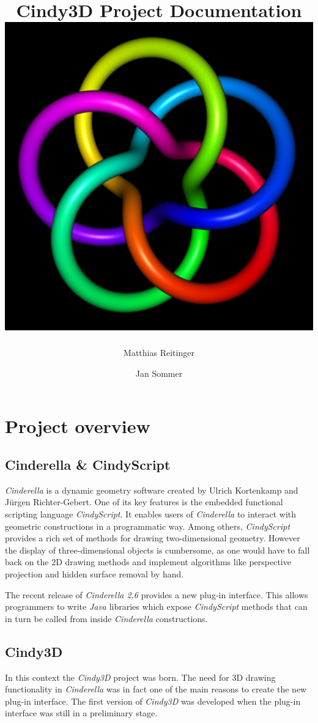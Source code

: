 \documentclass[appendixprefix,a4paper]{scrreprt}
\title{Cindy3D Project Documentation\vspace*{1cm}\\
\includegraphics[width=\textwidth]{title}}
\author{Matthias Reitinger \and Jan Sommer}
\begin{document}
\maketitle

\newpage

\tableofcontents

\newpage

\chapter{Project overview}

\section{Cinderella \& CindyScript}

\emph{Cinderella} is a dynamic geometry software created by Ulrich Kortenkamp and Jürgen Richter-Gebert. One of its key features is the embedded functional scripting language \emph{CindyScript}. It enables users of \emph{Cinderella} to interact with geometric constructions in a programmatic way. Among others, \emph{CindyScript} provides a rich set of methods for drawing two-dimensional geometry. However the display of three-dimensional objects is cumbersome, as one would have to fall back on the 2D drawing methods and implement algorithms like perspective projection and hidden surface removal by hand.

The recent release of \emph{Cinderella 2.6} provides a new plug-in interface. 
This allows programmers to write \emph{Java} libraries which expose 
\emph{CindyScript} methods that can in turn be called from inside 
\emph{Cinderella} constructions.

\section{Cindy3D}

In this context the \emph{Cindy3D} project was born. The need for 3D drawing 
functionality in \emph{Cinderella} was in fact one of the main reasons to 
create the new plug-in interface. The first version of \emph{Cindy3D} was 
developed when the plug-in interface was still in a preliminary stage.
\end{document}
